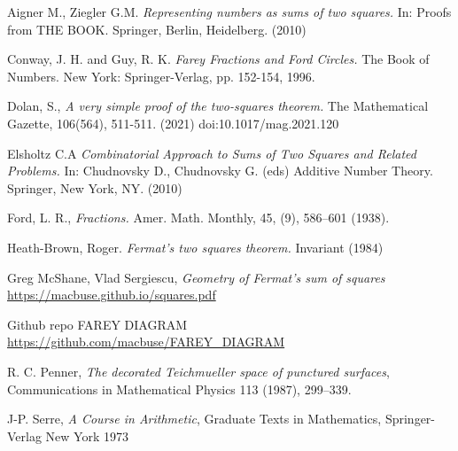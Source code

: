 \documentclass[12pt,a4paper]{amsart}
\begin{document}

Aigner M., Ziegler G.M.  
\textit{Representing numbers as sums of two squares.} In: Proofs from THE BOOK. Springer, Berlin, Heidelberg. (2010)

Conway, J. H. and Guy, R. K. \textit{Farey Fractions and Ford
Circles.} The Book of Numbers. New York: Springer-Verlag, pp. 152-154, 1996.

Dolan, S., 
\textit{A very simple proof of the two-squares theorem.}
The Mathematical Gazette, 106(564), 511-511. (2021) doi:10.1017/mag.2021.120

Elsholtz C.A 
\textit{Combinatorial Approach to Sums of Two Squares and Related Problems.}
 In: Chudnovsky D., Chudnovsky G. (eds) Additive Number Theory. Springer, New York, NY.
 (2010) 


Ford, L. R.,  \textit{Fractions.} Amer. Math. Monthly, 45, (9), 586–601 (1938).



%



Heath-Brown, Roger. 
\textit{ Fermat’s two squares theorem.} Invariant (1984) 




Greg McShane, Vlad Sergiescu,
\textit{Geometry of Fermat's sum of squares}
\url{https://macbuse.github.io/squares.pdf}

Github repo FAREY DIAGRAM \url{https://github.com/macbuse/FAREY_DIAGRAM}

R. C. Penner, 
\textit{The decorated Teichmueller space of punctured surfaces}, 
Communications in Mathematical Physics 113 (1987), 299–339.



J-P. Serre,
\textit{A Course in Arithmetic},
Graduate Texts in Mathematics,
Springer-Verlag New York
1973
\end{document}
